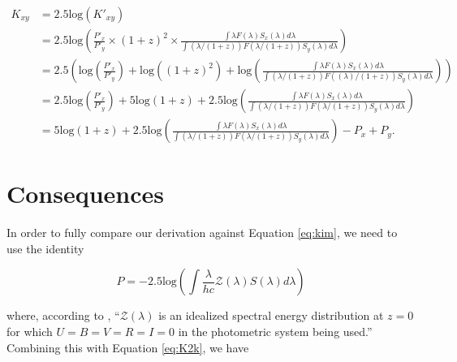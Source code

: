 \documentclass[linenumbers]{aastex631}
\begin{document}
\begin{equation}
\begin{aligned}
\label{eq:K2k}
  K_{xy} &= 2.5\text{log}(K'_{xy}) \\
         &= 2.5\text{log}\left(
            \frac{P'_x}{P'_y} \times (1 + z)^2 \times
            \frac{\int \lambda F(\lambda) S_x(\lambda) d\lambda}
                 {\int (\lambda / (1+z)) F(\lambda / (1+z)) S_y(\lambda) d\lambda}\right) \\
         &= 2.5 \left(
            \text{log} \left( \frac{P'_x}{P'_y} \right)
            + \text{log}( {(1 + z)^2})
            + \text{log}\left( \frac{\int \lambda F(\lambda) S_x(\lambda) d\lambda}
                                    {\int (\lambda / (1+z)) F((\lambda)/ (1+z)) S_y(\lambda) d\lambda}
            \right) \right) \\
         &= 2.5 \text{log} \left( \frac{P'_x}{P'_y} \right)
            + 5 \text{log} (1 + z)
            + 2.5 \text{log} \left(
              \frac{\int \lambda F(\lambda) S_x(\lambda) d\lambda}
                   {\int (\lambda / (1+z)) F(\lambda / (1+z)) S_y(\lambda) d\lambda} \right) \\
         &= 5 \text{log} (1 + z)
            + 2.5 \text{log} \left(
              \frac{\int \lambda F(\lambda) S_x(\lambda) d\lambda}
                   {\int (\lambda / (1+z)) F(\lambda / (1+z)) S_y(\lambda) d\lambda} \right)
            - P_x + P_y .
\end{aligned}
\end{equation}

\section{Consequences}
\label{sec:consequences}

In order to fully compare our derivation against Equation \ref{eq:kim}, we need
to use the identity

\begin{equation}
  P = -2.5 \text{log} \left( \int \frac{\lambda}{hc} \mathcal{Z}(\lambda) S(\lambda) d\lambda \right)
\end{equation}

\noindent where, according to \citet{kim1996}, ``$\mathcal{Z}(\lambda)$ is an
idealized spectral energy distribution at $z = 0$ for which
$U = B = V = R = I = 0$ in the photometric system being used.'' Combining this
with Equation \ref{eq:K2k}, we have
\end{document}
